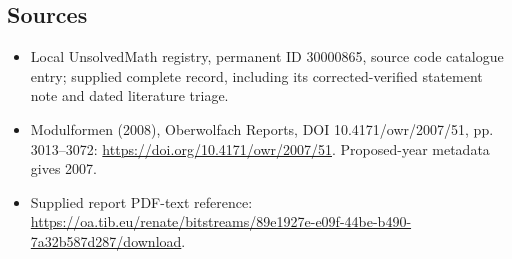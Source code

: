 \documentclass[11pt]{article}
\begin{document}
\subsection{Sources}
\begin{itemize}
\item Local UnsolvedMath registry, permanent ID 30000865, source code catalogue entry; supplied complete record, including its corrected-verified statement note and dated literature triage.
\item Modulformen (2008), Oberwolfach Reports, DOI 10.4171/owr/2007/51, pp. 3013--3072: \url{https://doi.org/10.4171/owr/2007/51}. Proposed-year metadata gives 2007.
\item Supplied report PDF-text reference: \url{https://oa.tib.eu/renate/bitstreams/89e1927e-e09f-44be-b490-7a32b587d287/download}.
\end{itemize}
\end{document}
